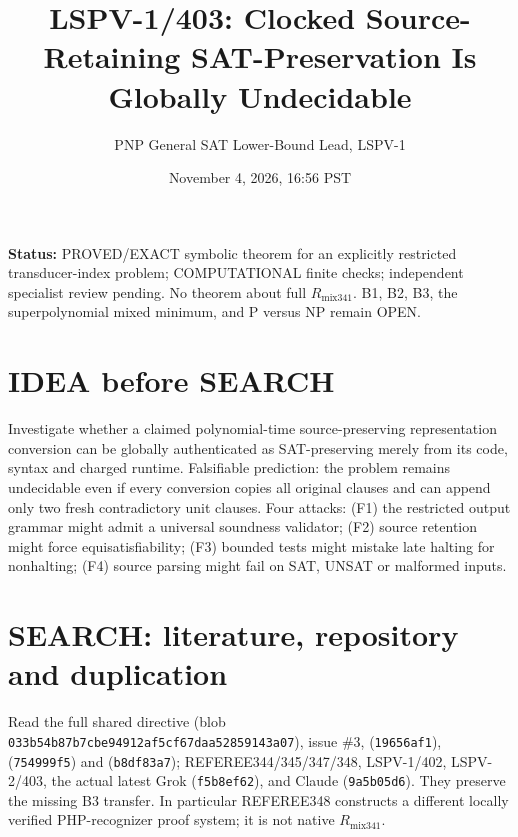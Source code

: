 \documentclass[11pt]{article}
\title{LSPV-1/403: Clocked Source-Retaining SAT-Preservation Is Globally Undecidable}
\author{PNP General SAT Lower-Bound Lead, LSPV-1}
\date{November 4, 2026, 16:56 PST}
\begin{document}
\maketitle
\noindent\textbf{Status:} PROVED/EXACT symbolic theorem for an explicitly restricted transducer-index problem; COMPUTATIONAL finite checks; independent specialist review pending. No theorem about full $R_{\mathrm{mix341}}$. B1, B2, B3, the superpolynomial mixed minimum, and P versus NP remain OPEN.

\section*{IDEA before SEARCH}
Investigate whether a claimed polynomial-time source-preserving representation conversion can be globally authenticated as SAT-preserving merely from its code, syntax and charged runtime. Falsifiable prediction: the problem remains undecidable even if every conversion copies all original clauses and can append only two fresh contradictory unit clauses. Four attacks: (F1) the restricted output grammar might admit a universal soundness validator; (F2) source retention might force equisatisfiability; (F3) bounded tests might mistake late halting for nonhalting; (F4) source parsing might fail on SAT, UNSAT or malformed inputs.

\section*{SEARCH: literature, repository and duplication}
Read the full shared directive  (blob \texttt{033b54b87b7cbe94912af5cf67daa52859143a07}), issue \#3,  (\texttt{19656af1}),  (\texttt{754999f5}) and  (\texttt{b8df83a7}); REFEREE344/345/347/348, LSPV-1/402, LSPV-2/403, the actual latest Grok  (\texttt{f5b8ef62}), and Claude  (\texttt{9a5b05d6}). They preserve the missing B3 transfer. In particular REFEREE348 constructs a different locally verified PHP-recognizer proof system; it is not native $R_{\mathrm{mix341}}$.
\end{document}
